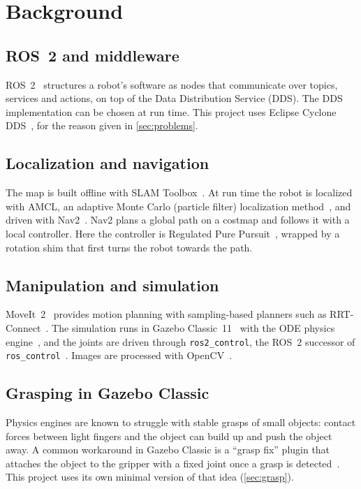 \documentclass[journal]{IEEEtran}
\begin{document}
\section{Background}

\subsection{ROS~2 and middleware}
ROS~2~\cite{macenski2022ros2} structures a robot's software as nodes that communicate over topics, services and actions, on top of the Data Distribution Service (DDS). The DDS implementation can be chosen at run time. This project uses Eclipse Cyclone DDS~\cite{cyclonedds}, for the reason given in \cref{sec:problems}.

\subsection{Localization and navigation}
The map is built offline with SLAM Toolbox~\cite{macenski2021slam}. At run time the robot is localized with AMCL, an adaptive Monte Carlo (particle filter) localization method~\cite{fox1999mcl,thrun2005probabilistic}, and driven with Nav2~\cite{macenski2020marathon}. Nav2 plans a global path on a costmap and follows it with a local controller. Here the controller is Regulated Pure Pursuit~\cite{macenski2023rpp}, wrapped by a rotation shim that first turns the robot towards the path.

\subsection{Manipulation and simulation}
MoveIt~2~\cite{coleman2014moveit} provides motion planning with sampling-based planners such as RRT-Connect~\cite{kuffner2000rrtconnect}. The simulation runs in Gazebo Classic~11~\cite{koenig2004gazebo} with the ODE physics engine~\cite{ode}, and the joints are driven through \texttt{ros2\_control}, the ROS~2 successor of \texttt{ros\_control}~\cite{chitta2017roscontrol}. Images are processed with OpenCV~\cite{bradski2000opencv}.

\subsection{Grasping in Gazebo Classic}
Physics engines are known to struggle with stable grasps of small objects: contact forces between light fingers and the object can build up and push the object away. A common workaround in Gazebo Classic is a ``grasp fix'' plugin that attaches the object to the gripper with a fixed joint once a grasp is detected~\cite{buehler_grasp}. This project uses its own minimal version of that idea (\cref{sec:grasp}).
\end{document}
